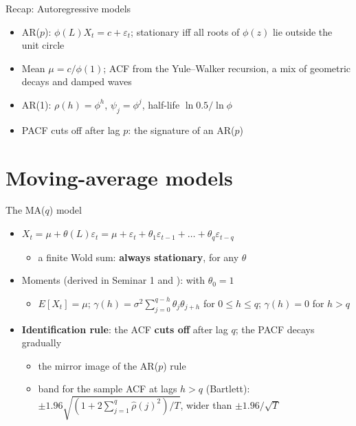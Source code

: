 \begin{frame}{Recap: Autoregressive models}
\itemsize{\small}
\begin{itemize}
    \item AR($p$): $\phi(L)X_t = c + \varepsilon_t$; stationary iff all roots of $\phi(z)$ lie outside the unit circle
    \item Mean $\mu = c/\phi(1)$; ACF from the Yule--Walker recursion, a mix of geometric decays and damped waves
    \item AR(1): $\rho(h) = \phi^h$, $\psi_j = \phi^j$, half-life $\ln 0.5/\ln\phi$
    \item PACF cuts off after lag $p$: the signature of an AR($p$)
\end{itemize}
\end{frame}


\section{Moving-average models}

\begin{frame}{The MA($q$) model}
\itemsize{\small}
\begin{itemize}
    \item $X_t = \mu + \theta(L)\varepsilon_t = \mu + \varepsilon_t + \theta_1\varepsilon_{t-1} + \dots + \theta_q\varepsilon_{t-q}$
    \begin{itemize}
        \item a finite Wold sum: \textbf{always stationary}, for any $\theta$
    \end{itemize}
    \item Moments (derived in Seminar 1 and ): with $\theta_0 = 1$
    \begin{itemize}
        \item $E[X_t] = \mu$; $\gamma(h) = \sigma^2\sum_{j=0}^{q-h}\theta_j\theta_{j+h}$ for $0 \le h \le q$; $\gamma(h) = 0$ for $h > q$
    \end{itemize}
    \item \textbf{Identification rule}: the ACF \textbf{cuts off} after lag $q$; the PACF decays gradually
    \begin{itemize}
        \item the mirror image of the AR($p$) rule
        \item band for the sample ACF at lags $h > q$ (Bartlett): $\pm 1.96\sqrt{(1 + 2\sum_{j=1}^{q}\hat\rho(j)^2)/T}$, wider than $\pm 1.96/\sqrt{T}$
    \end{itemize}
\end{itemize}
\end{frame}

